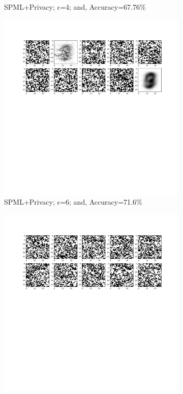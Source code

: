 \begin{figure}
\begin{subfigure}{.325\textwidth}
         \vspace{-8em}
         \caption{SPML+Privacy; $\epsilon$=4; and, Accuracy=67.76\%}
         \label{default}
     \end{subfigure}
     \begin{subfigure}{.325\textwidth}
         \includegraphics[width=\textwidth]{images/Sim_attack/Mnistattack6.pdf}
         \vspace{-8em}
         \caption{SPML+Privacy; $\epsilon$=6; and, Accuracy=71.6\%}
         \label{default}
     \end{subfigure}
     \begin{subfigure}{.325\textwidth}
         \includegraphics[width=\textwidth]{images/Sim_attack/Mnistattack8.pdf}

\end{subfigure}
\end{figure}
